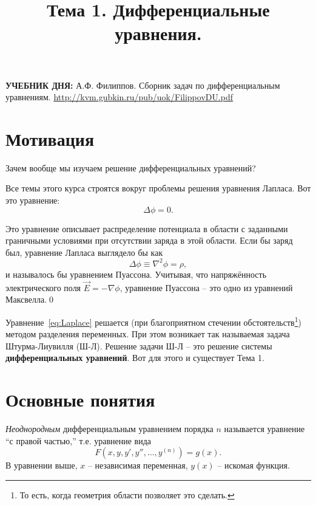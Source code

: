 \documentclass[12pt]{report}
\title{Тема 1. Дифференциальные уравнения.}
\begin{document}
	\maketitle
	
	\begin{tcolorbox}
		\textbf{УЧЕБНИК ДНЯ:}
		А.Ф. Филиппов. Сборник задач по дифференциальным уравнениям.
		\url{http://kvm.gubkin.ru/pub/uok/FilippovDU.pdf}
	\end{tcolorbox}
	
\section{Мотивация}
Зачем вообще мы изучаем решение дифференциальных уравнений?

Все темы этого курса строятся вокруг проблемы решения уравнения Лапласа. Вот это уравнение:
 \begin{equation}\label{eq:Laplace}
 \Delta\phi = 0.
 \end{equation}
  
\begin{rmk}
	 Это уравнение описывает распределение потенциала в области с заданными граничными условиями при отсутствии заряда в этой области. Если бы заряд был, уравнение Лапласа выглядело бы как
	\[
	\Delta\phi \equiv \nabla^2\phi = \rho,
	\]
	и называлось бы уравнением Пуассона. Учитывая, что напряжённость электрического поля $\vec E = -\nabla\phi$, уравнение Пуассона -- это одно из уравнений Максвелла.\qed
\end{rmk}

Уравнение~\eqref{eq:Laplace} решается (при благоприятном стечении обстоятельств\footnote{То есть, когда геометрия области позволяет это сделать.}) методом разделения переменных.	При этом возникает так называемая задача Штурма-Лиувилля (Ш-Л). Решение задачи Ш-Л -- это решение системы \textbf{дифференциальных уравнений}. Вот для этого и существует Тема 1.

\section{Основные понятия}
\emph{Неоднородным} дифференциальным уравнением порядка $n$ называется уравнение ``с правой частью,'' т.е. уравнение вида
\begin{equation}\label{eq:inhomogenous}
	F\left(x,y,y',y'',\dots, y^{(n)}\right) = g(x).
\end{equation}
В уравнении выше, $x$ -- независимая переменная, $y(x)$ -- искомая функция.
\end{document}
